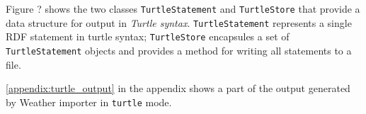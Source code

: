 Figure ? shows the two classes \texttt{TurtleStatement} and \texttt{TurtleStore} that provide a data structure for output in \emph{Turtle syntax}. \texttt{TurtleStatement} represents a single RDF statement in turtle syntax; \texttt{TurtleStore} encapsules a set of \texttt{TurtleStatement} objects and provides a method for writing all statements to a file.

\ref{appendix:turtle_output} in the appendix shows a part of the output generated by Weather importer in \texttt{turtle} mode.









